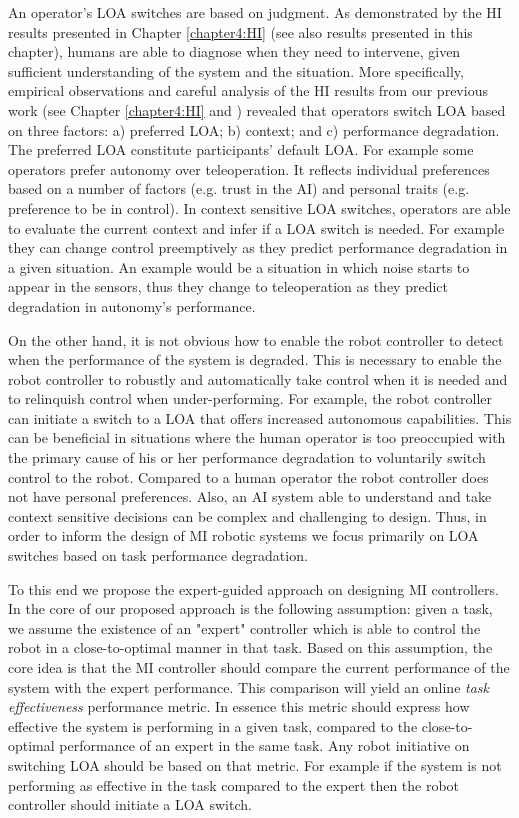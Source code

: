 \documentclass[a4paper,12pt,oneside,openright]{bhamthesis}
\begin{document}
An operator's LOA switches are based on judgment. As demonstrated by the HI results presented in Chapter \ref{chapter4:HI} (see also results presented in this chapter), humans are able to diagnose when they need to intervene, given sufficient understanding of the system and the situation. More specifically, empirical observations and careful analysis of the HI results from our previous work (see Chapter \ref{chapter4:HI} and \citep{Chiou2016,Chiou2016_AAAI}) revealed that operators switch LOA based on three factors: a) preferred LOA; b) context; and c) performance degradation. The preferred LOA constitute participants' default LOA. For example some operators prefer autonomy over teleoperation. It reflects individual preferences based on a number of factors (e.g. trust in the AI) and personal traits (e.g. preference to be in control). In context sensitive LOA switches, operators are able to evaluate the current context and infer if a LOA switch is needed. For example they can change control preemptively as they predict performance degradation in a given situation. An example would be a situation in which noise starts to appear in the sensors, thus they change to teleoperation as they predict degradation in autonomy's performance.

On the other hand, it is not obvious how to enable the robot controller to detect when the performance of the system is degraded. This is necessary to enable the robot controller to robustly and automatically take control when it is needed and to relinquish control when under-performing. For example, the robot controller can initiate a switch to a LOA that offers increased autonomous capabilities. This can be beneficial in situations where the human operator is too preoccupied with the primary cause of his or her performance degradation to voluntarily switch control to the robot. Compared to a human operator the robot controller does not have personal preferences. Also, an AI system able to understand and take context sensitive decisions can be complex and challenging to design. Thus, in order to inform the design of MI robotic systems we focus primarily on LOA switches based on task performance degradation. 

To this end we propose the expert-guided approach on designing MI controllers. In the core of our proposed approach is the following assumption: given a task, we assume the existence of an "expert" controller which is able to control the robot in a close-to-optimal manner in that task. Based on this assumption, the core idea is that the MI controller should compare the current performance of the system with the expert performance. This comparison will yield an online \textit{task effectiveness} performance metric. In essence this metric should express how effective the system is performing in a given task, compared to the close-to-optimal performance of an expert in the same task. Any robot initiative on switching LOA should be based on that metric. For example if the system is not performing as effective in the task compared to the expert then the robot controller should initiate a LOA switch.
\end{document}
